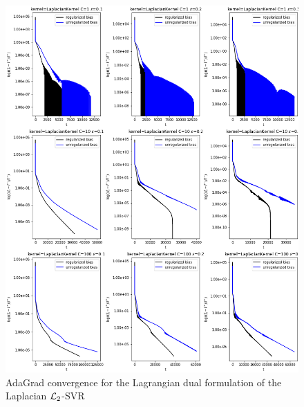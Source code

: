 

\begin{figure}[H]
	\centering
	\includegraphics[scale=0.55]{img/laplacian_lagrangian_dual_l2_svr_loss_history}
	\caption{AdaGrad convergence for the Lagrangian dual formulation of the Laplacian $\protect \mathcal{L}_2$-SVR}
	\label{fig:laplacian_lagrangian_dual_l2_svr_loss_history}
\end{figure}

